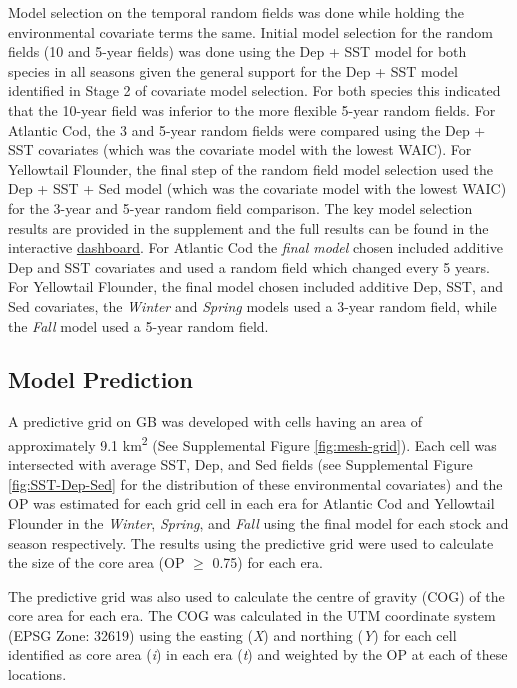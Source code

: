 \documentclass[
]{article}
\begin{document}
Model selection on the temporal random fields was done while holding the environmental covariate terms the same. Initial model selection for the random fields (10 and 5-year fields) was done using the Dep + SST model for both species in all seasons given the general support for the Dep + SST model identified in Stage 2 of covariate model selection. For both species this indicated that the 10-year field was inferior to the more flexible 5-year random fields. For Atlantic Cod, the 3 and 5-year random fields were compared using the Dep + SST covariates (which was the covariate model with the lowest WAIC). For Yellowtail Flounder, the final step of the random field model selection used the Dep + SST + Sed model (which was the covariate model with the lowest WAIC) for the 3-year and 5-year random field comparison. The key model selection results are provided in the supplement and the full results can be found in the interactive \href{https://github.com/Dave-Keith/Paper_2_SDMs/tree/master/Dashboard}{dashboard}. For Atlantic Cod the \emph{final model} chosen included additive Dep and SST covariates and used a random field which changed every 5 years. For Yellowtail Flounder, the final model chosen included additive Dep, SST, and Sed covariates, the \emph{Winter} and \emph{Spring} models used a 3-year random field, while the \emph{Fall} model used a 5-year random field.

\hypertarget{model-prediction}{%
\subsection{Model Prediction}\label{model-prediction}}

A predictive grid on GB was developed with cells having an area of approximately 9.1 km\textsuperscript{2} (See Supplemental Figure \ref{fig:mesh-grid}). Each cell was intersected with average SST, Dep, and Sed fields (see Supplemental Figure \ref{fig:SST-Dep-Sed} for the distribution of these environmental covariates) and the OP was estimated for each grid cell in each era for Atlantic Cod and Yellowtail Flounder in the \emph{Winter}, \emph{Spring}, and \emph{Fall} using the final model for each stock and season respectively. The results using the predictive grid were used to calculate the size of the core area (OP \(\geq\) 0.75) for each era.

The predictive grid was also used to calculate the centre of gravity (COG) of the core area for each era. The COG was calculated in the UTM coordinate system (EPSG Zone: 32619) using the easting (\emph{X}) and northing (\emph{Y}) for each cell identified as core area (\emph{i}) in each era (\emph{t}) and weighted by the OP at each of these locations.
\end{document}
